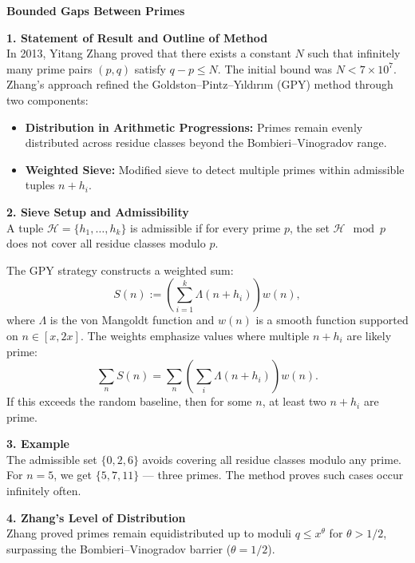 \begin{technical}
{\Large\textbf{Bounded Gaps Between Primes}}

\textbf{1. Statement of Result and Outline of Method}\\[0.5em]
In 2013, Yitang Zhang proved that there exists a constant \( N \) such that infinitely many prime pairs \( (p, q) \) satisfy \( q - p \leq N \). The initial bound was \( N < 7\times10^7 \). Zhang's approach refined the Goldston–Pintz–Yıldırım (GPY) method through two components:

\begin{itemize}[leftmargin=*]
    \item \textbf{Distribution in Arithmetic Progressions:} Primes remain evenly distributed across residue classes beyond the Bombieri–Vinogradov range.
    \item \textbf{Weighted Sieve:} Modified sieve to detect multiple primes within admissible tuples \( n + h_i \).
\end{itemize}

\vspace{0.7em}
\textbf{2. Sieve Setup and Admissibility}\\[0.5em]
A tuple \( \mathcal{H} = \{h_1, \dots, h_k\} \) is admissible if for every prime \( p \), the set \( \mathcal{H} \mod p \) does not cover all residue classes modulo \( p \).

The GPY strategy constructs a weighted sum:
\[
S(n) := \left( \sum_{i=1}^k \Lambda(n + h_i) \right) w(n),
\]
where \( \Lambda \) is the von Mangoldt function and \( w(n) \) is a smooth function supported on \( n \in [x, 2x] \). The weights emphasize values where multiple \( n + h_i \) are likely prime:
\[
\sum_{n} S(n) = \sum_{n} \left( \sum_i \Lambda(n + h_i) \right) w(n).
\]
If this exceeds the random baseline, then for some \( n \), at least two \( n + h_i \) are prime.

\vspace{0.7em}
\textbf{3. Example}\\[0.5em]
The admissible set \( \{0, 2, 6\} \) avoids covering all residue classes modulo any prime. For \( n = 5 \), we get \( \{5, 7, 11\} \) — three primes. The method proves such cases occur infinitely often.

\vspace{0.7em}
\textbf{4. Zhang’s Level of Distribution}\\[0.5em]
Zhang proved primes remain equidistributed up to moduli \( q \le x^\theta \) for \( \theta > 1/2 \), surpassing the Bombieri–Vinogradov barrier (\( \theta = 1/2 \)).


\end{technical}
